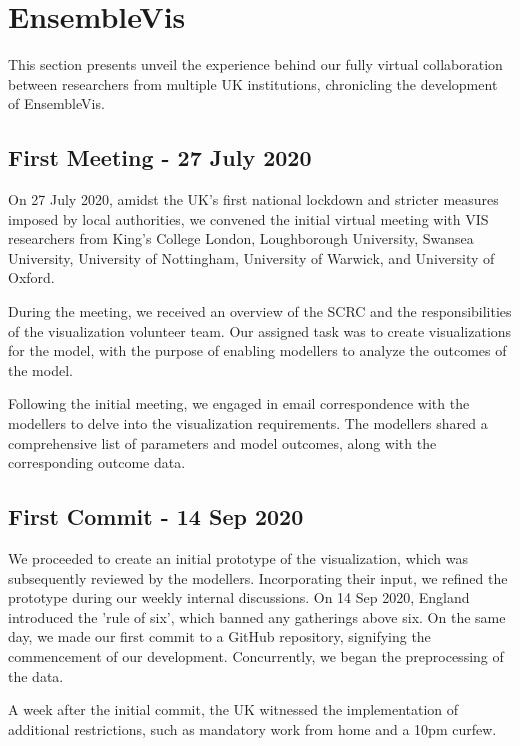 \section{EnsembleVis}
\label{sec:EnsembleVis}

This section presents unveil the experience behind our fully virtual collaboration between researchers from multiple UK institutions, chronicling the development of EnsembleVis.

\subsection{First Meeting - 27 July 2020}
\label{subsec:InitialMeeting}
On 27 July 2020, amidst the UK's first national lockdown and stricter measures imposed by local authorities, we convened the initial virtual meeting with VIS researchers from King's College London, Loughborough University, Swansea University, University of Nottingham, University of Warwick, and University of Oxford.

During the meeting, we received an overview of the SCRC and the responsibilities of the visualization volunteer team.
Our assigned task was to create visualizations for the model, with the purpose of enabling modellers to analyze the outcomes of the model.

Following the initial meeting, we engaged in email correspondence with the modellers to delve into the visualization requirements. The modellers shared a comprehensive list of parameters and model outcomes, along with the corresponding outcome data.
\subsection{First Commit - 14 Sep 2020}
We proceeded to create an initial prototype of the visualization, which was subsequently reviewed by the modellers.
Incorporating their input, we refined the prototype during our weekly internal discussions.
On 14 Sep 2020, England introduced the 'rule of six', which banned any gatherings above six.
On the same day, we made our first commit to a GitHub repository, signifying the commencement of our development.
Concurrently, we began the preprocessing of the data.

A week after the initial commit, the UK witnessed the implementation of additional restrictions, such as mandatory work from home and a 10pm curfew.

